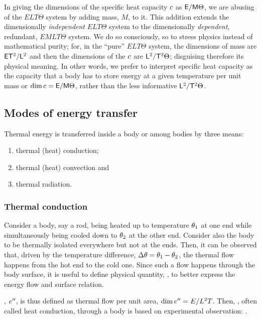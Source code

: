\begin{technote}
In giving the dimensions of the specific heat capacity $c$ as $\mathsf{E}/\mathsf{M}\Theta$, we are abusing of the $ELT\Theta$ system by adding mass, $M$, to it. This addition extends the dimensionally \emph{independent} $ELT\Theta$ system to the dimensionally \emph{dependent}, redundant, $EMLT\Theta$ system. We do so consciously, so to stress physics instead of mathematical purity; for, in the ``pure'' $ELT\Theta$ system, the dimensions of mass are $\mathsf{E}\mathsf{T}^2/\mathsf{L}^2$ and then the dimensions of the $c$ are $\mathsf{L}^2/\mathsf{T}^2\Theta$; disguising therefore its physical meaning. In other words, we prefer to interpret specific heat capacity as the capacity that a body has to store energy at a given temperature per unit mass or $\dim c = \mathsf{E}/\mathsf{M}\Theta$, rather than the less informative $\mathsf{L}^2/\mathsf{T}^2\Theta$.
\end{technote}


\subsection{Modes of energy transfer}
Thermal energy is transferred inside a body or among bodies by three means:
\begin{enumerate}
\item thermal (heat) conduction;
\item thermal (heat) convection and
\item thermal radiation.
\end{enumerate}


\subsubsection{Thermal conduction}
Consider a body, say a rod, being heated up to temperature $\theta_1$ at one end while simultaneously being cooled down to $\theta_2$ at the other end. Consider also the body to be thermally isolated everywhere but not at the ends. Then, it can be observed that, driven by the temperature difference, $\Delta\theta = \theta_1 - \theta_2$, the thermal flow happens from the hot end to the cold one. Since such a flow happens through the body surface, it is useful to define physical quantity, , to better express the energy flow and surface relation.

, ${e}^{\prime\prime}$, is thus defined as thermal flow per unit area, $\dim{e}^{\prime\prime} = E/L^2T$. Then, , often called heat conduction, through a body is based on experimental observation: . 

